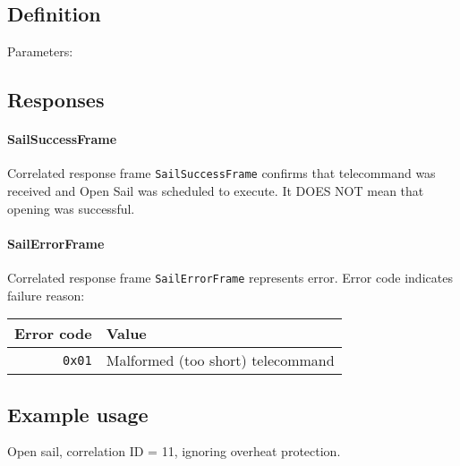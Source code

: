 \subsection{Definition}

Parameters: 

\begin{tcarglist}
\end{tcarglist}


\subsection{Responses}

\paragraph{SailSuccessFrame}
Correlated response frame \texttt{SailSuccessFrame} confirms that telecommand was received and Open Sail was scheduled to execute. It DOES NOT mean that opening was successful. 

\paragraph{SailErrorFrame}
Correlated response frame \texttt{SailErrorFrame} represents error. Error code indicates failure reason:

\begin{tabular}{r | l}
	Error code & Value \\
	\hline
	\texttt{0x01} & Malformed (too short) telecommand \\
\end{tabular}

\subsection{Example usage}
Open sail, correlation ID = 11, ignoring overheat protection.

